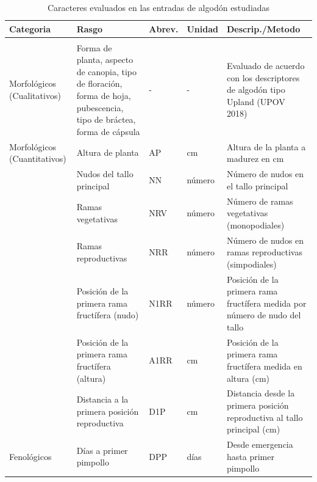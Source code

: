 \documentclass[12pt,oneside]{reedthesis}
\begin{document}
\begin{landscape}
\begin{table}[!h]
\centering
\caption{\label{tab:tableVariables-combined}Caracteres evaluados en las entradas de algod\'{o}n estudiadas}
\centering
\fontsize{8}{10}\selectfont
\begin{tabular}[t]{>{\raggedright\arraybackslash}p{5.3cm}>{\raggedright\arraybackslash}p{5.5cm}>{\raggedright\arraybackslash}p{1.0cm}>{\raggedright\arraybackslash}p{2.0cm}>{\raggedright\arraybackslash}p{8.8cm}}
\toprule
\textbf{Categoria} & \textbf{Rasgo} & \textbf{Abrev.} & \textbf{Unidad} & \textbf{Descrip./Metodo}\\
\midrule
\addlinespace[0.3em]
\multicolumn{5}{l}{\textbf{Caracteres evaluados en las 26 entradas}}\\
\hline
\hspace{1em}Morfológicos (Cualitativos) & Forma de planta, aspecto de canopia, tipo de floración, forma de hoja, pubescencia, tipo de bráctea, forma de cápsula & - & - & Evaluado de acuerdo con los descriptores de algodón tipo Upland (UPOV 2018)\\
\hspace{1em}Morfológicos (Cuantitativos) & Altura de planta & AP & cm & Altura de la planta a madurez en cm\\
\hspace{1em} & Nudos del tallo principal & NN & número & Número de nudos en el tallo principal\\
\hspace{1em} & Ramas vegetativas & NRV & número & Número de ramas vegetativas (monopodiales)\\
\hspace{1em} & Ramas reproductivas & NRR & número & Número de nudos en ramas reproductivas (simpodiales)\\
\hspace{1em} & Posición de la primera rama fructífera (nudo) & N1RR & número & Posición de la primera rama fructífera medida por número de nudo del tallo\\
\hspace{1em} & Posición de la primera rama fructífera (altura) & A1RR & cm & Posición de la primera rama fructífera medida en altura (cm)\\
\hspace{1em} & Distancia a la primera posición reproductiva & D1P & cm & Distancia desde la primera posición reproductiva al tallo principal (cm)\\
\hspace{1em}Fenológicos & Días a primer pimpollo & DPP & días & Desde emergencia hasta primer pimpollo\\

\end{tabular}
\end{table}
\end{landscape}
\end{document}
